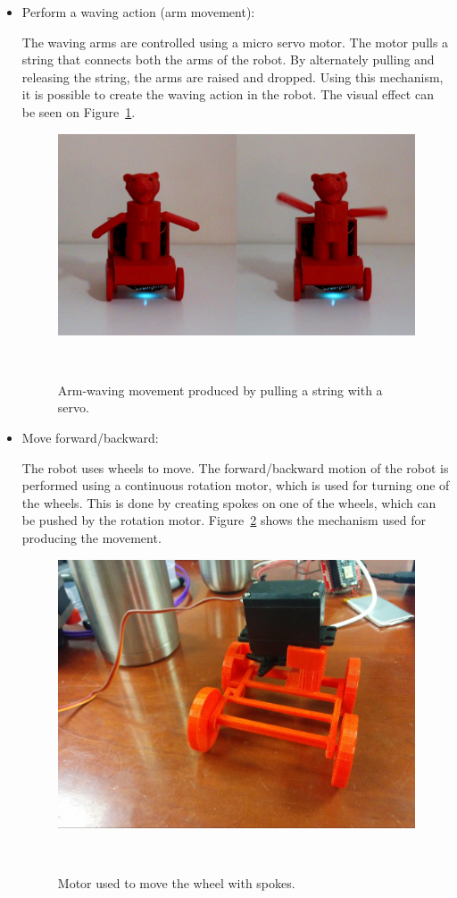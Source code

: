 \documentclass{sigchi-ext}
\begin{document}
\begin{itemize}
  \item Perform a waving action (arm movement):

    The waving arms are controlled using a micro servo motor. The motor pulls a
    string that connects both the arms of the robot. By alternately pulling and
    releasing the string, the arms are raised and dropped. Using this
    mechanism, it is possible to create the waving action in the robot. The
    visual effect can be seen on Figure~\ref{fig:arms}.

\begin{figure}
  \includegraphics[width=0.9\columnwidth]{../photos/arms}
  \caption{Arm-waving movement produced by pulling a string with a
    servo.}~\label{fig:arms}
\end{figure}

\item Move forward/backward:

  The robot uses wheels to move. The forward/backward motion of the robot is
  performed using a continuous rotation motor, which is used for turning one of
  the wheels. This is done by creating spokes on one of the wheels, which can
  be pushed by the rotation motor. Figure~\ref{fig:motor} shows the mechanism
  used for producing the movement.

\begin{figure}
  \includegraphics[width=0.9\columnwidth]{../photos/motor}
  \caption{Motor used to move the wheel with spokes.}~\label{fig:motor}
\end{figure}


\end{itemize}
\end{document}
